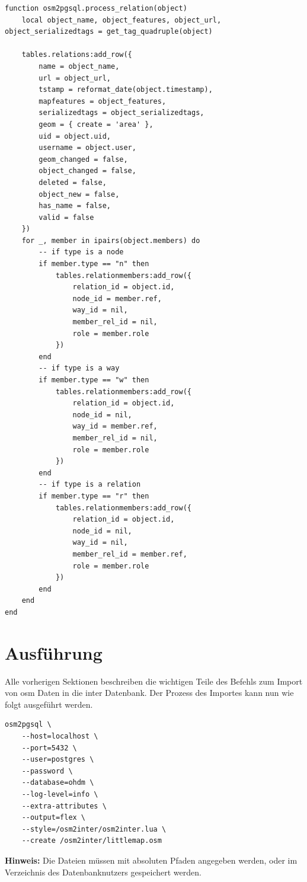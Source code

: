 \newpage\begin{lstlisting}[language={[5.0]Lua}, caption={Hilfsfunktion zur osm object.tag Verarbeitung},label={lst:process-relation}]
	function osm2pgsql.process_relation(object)
	local object_name, object_features, object_url, object_serializedtags = get_tag_quadruple(object)
	
	tables.relations:add_row({
		name = object_name,
		url = object_url,
		tstamp = reformat_date(object.timestamp),
		mapfeatures = object_features,
		serializedtags = object_serializedtags,
		geom = { create = 'area' },
		uid = object.uid,
		username = object.user,
		geom_changed = false,
		object_changed = false,
		deleted = false,
		object_new = false,
		has_name = false,
		valid = false
	})
	for _, member in ipairs(object.members) do
		-- if type is a node
		if member.type == "n" then
			tables.relationmembers:add_row({
				relation_id = object.id,
				node_id = member.ref,
				way_id = nil,
				member_rel_id = nil,
				role = member.role
			})
		end
		-- if type is a way
		if member.type == "w" then
			tables.relationmembers:add_row({
				relation_id = object.id,
				node_id = nil,
				way_id = member.ref,
				member_rel_id = nil,
				role = member.role
			})
		end
		-- if type is a relation
		if member.type == "r" then
			tables.relationmembers:add_row({
				relation_id = object.id,
				node_id = nil,
				way_id = nil,
				member_rel_id = member.ref,
				role = member.role
			})
		end
	end
end
\end{lstlisting}


\newpage
\section{Ausführung}
Alle vorherigen Sektionen beschreiben die wichtigen Teile des Befehls zum Import von \gls{osm} Daten in die \gls{inter} Datenbank. Der Prozess des Importes kann nun wie folgt ausgeführt werden.
\begin{lstlisting}[language={},basicstyle=\ttfamily,caption={Beispiel eines \gequote{osm2pgsql} Befehls mit dem osm2inter.lua Skript und dem Minimalbeispieldaten littlemap.osm}]
	osm2pgsql \
	--host=localhost \
	--port=5432 \
	--user=postgres \
	--password \
	--database=ohdm \
	--log-level=info \
	--extra-attributes \
	--output=flex \
	--style=/osm2inter/osm2inter.lua \
	--create /osm2inter/littlemap.osm
\end{lstlisting}
\textbf{Hinweis:} Die Dateien müssen mit absoluten Pfaden angegeben werden, oder im Verzeichnis des Datenbanknutzers gespeichert werden.\\

